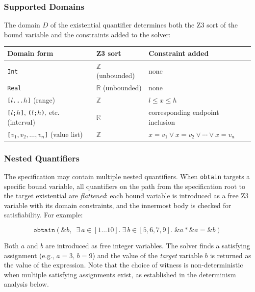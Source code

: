 \documentclass{article}
\begin{document}
\subsubsection*{Supported Domains}

The domain $D$ of the existential quantifier determines both the Z3 sort of the bound variable and the constraints added to the solver:

\begin{center}
\renewcommand{\arraystretch}{1.4}
\begin{tabular}{|l|l|l|}
\hline
\textbf{Domain form} & \textbf{Z3 sort} & \textbf{Constraint added} \\
\hline
\texttt{Int} & $\mathbb{Z}$ (unbounded) & none \\
\texttt{Real} & $\mathbb{R}$ (unbounded) & none \\
\texttt{[$l$...$h$]} (range) & $\mathbb{Z}$ & $l \leq x \leq h$ \\
\texttt{[$l$;$h$]}, \texttt{($l$;$h$)}, etc. (interval) & $\mathbb{R}$ & corresponding endpoint inclusion \\
\texttt{[$v_1, v_2, \ldots, v_n$]} (value list) & $\mathbb{Z}$ & $x = v_1 \lor x = v_2 \lor \cdots \lor x = v_n$ \\
\hline
\end{tabular}
\end{center}

\subsubsection*{Nested Quantifiers}

The specification may contain multiple nested quantifiers. When \texttt{obtain} targets a specific bound variable, all quantifiers on the path from the specification root to the target existential are \emph{flattened}: each bound variable is introduced as a free Z3 variable with its domain constraints, and the innermost body is checked for satisfiability. For example:

\[
\mathtt{obtain}(\texttt{\&}b,\;\; \exists\, a \in [1\ldots 10].\; \exists\, b \in [5,6,7,9].\; \texttt{\&}a * \texttt{\&}a = \texttt{\&}b)
\]

Both $a$ and $b$ are introduced as free integer variables. The solver finds a satisfying assignment (e.g., $a = 3,\, b = 9$) and the value of the \emph{target} variable $b$ is returned as the value of the expression. Note that the choice of witness is non-deterministic when multiple satisfying assignments exist, as established in the determinism analysis below.
\end{document}

